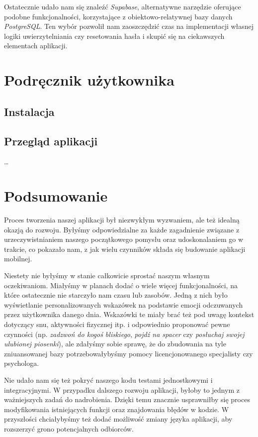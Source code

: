 \documentclass[inz, shortabstract]{iithesis}
\begin{document}
Ostatecznie udało nam się znaleźć \textit{Supabase}, alternatywne narzędzie oferujące podobne funkcjonalności, korzystające z obiektowo-relatywnej bazy danych \textit{PostgreSQL}. Ten wybór pozwolił nam zaoszczędzić czas na implementacji własnej logiki uwierzytelniania czy resetowania hasła i skupić się na ciekawszych elementach aplikacji.
\chapter{Podręcznik użytkownika}
\section{Instalacja}
\section{Przegląd aplikacji}

\ldots

\chapter{Podsumowanie}
Proces tworzenia naszej aplikacji był niezwykłym wyzwaniem, ale też idealną okazją do rozwoju. Byłyśmy odpowiedzialne za każde zagadnienie związane z urzeczywistnianiem naszego początkowego pomysłu oraz udoskonalaniem go w trakcie, co pokazało nam, z jak wielu czynników składa się budowanie aplikacji mobilnej. 

Niestety nie byłyśmy w stanie całkowicie sprostać naszym własnym oczekiwaniom. Miałyśmy w planach dodać o wiele więcej funkcjonalności, na które ostatecznie nie starczyło nam czasu lub zasobów. Jedną z nich było wyświetlanie personalizowanych wskazówek na podstawie emocji odczuwanych przez użytkownika danego dnia. Wskazówki te miały brać też pod uwagę kontekst dotyczący snu, aktywności fizycznej itp. i odpowiednio proponować pewne czynności (np. \textit{zadzwoń do kogoś bliskiego}, \textit{pojdź na spacer} czy \textit{posłuchaj swojej ulubionej piosenki}), ale zdałyśmy sobie sprawę, że do zbudowania na tyle zniuansowanej bazy potrzebowałybyśmy pomocy licencjonowanego specjalisty czy psychologa. 

Nie udało nam się też pokryć naszego kodu testami jednostkowymi i integracyjnymi. W przypadku dalszego rozwoju aplikacji, byłoby to jednym z ważniejszych zadań do nadrobienia. Dzięki temu znacznie usprawniłby się proces modyfikowania istniejących funkcji oraz znajdowania błędów w kodzie. W przyszłości chciałybyśmy też dodać możliwość zmiany języka aplikacji, aby rozszerzyć grono potencjalnych odbiorców.
\end{document}
